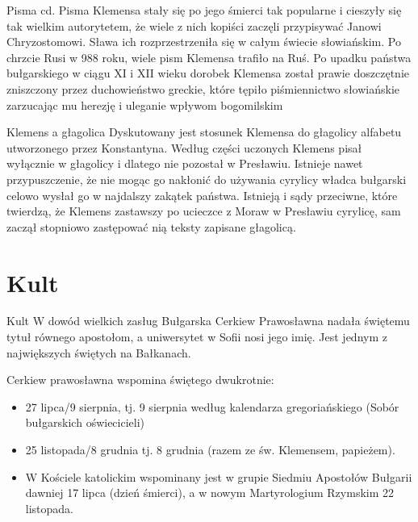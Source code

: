 \documentclass{beamer}
\begin{document}
\begin{frame}{Pisma cd.}
Pisma Klemensa stały się po jego śmierci tak popularne i cieszyły się tak wielkim autorytetem, że wiele z nich kopiści zaczęli przypisywać Janowi Chryzostomowi. Sława ich rozprzestrzeniła się w całym świecie słowiańskim. Po chrzcie Rusi w 988 roku, wiele pism Klemensa trafiło na Ruś. Po upadku państwa bułgarskiego w ciągu XI i XII wieku dorobek Klemensa został prawie doszczętnie zniszczony przez duchowieństwo greckie, które tępiło piśmiennictwo słowiańskie zarzucając mu herezję i uleganie wpływom bogomilskim
\end{frame}

\begin{frame}{Klemens a głagolica}
Dyskutowany jest stosunek Klemensa do głagolicy alfabetu utworzonego przez Konstantyna. Według części uczonych Klemens pisał wyłącznie w głagolicy i dlatego nie pozostał w Presławiu. Istnieje nawet przypuszczenie, że nie mogąc go nakłonić do używania cyrylicy władca bułgarski celowo wysłał go w najdalszy zakątek państwa. Istnieją i sądy przeciwne, które twierdzą, że Klemens zastawszy po ucieczce z Moraw w Presławiu cyrylicę, sam zaczął stopniowo zastępować nią teksty zapisane głagolicą.
\end{frame}

\section{Kult}
\begin{frame}{Kult}
W dowód wielkich zasług Bułgarska Cerkiew Prawosławna nadała świętemu tytuł równego apostołom, a uniwersytet w Sofii nosi jego imię. Jest jednym z największych świętych na Bałkanach.

Cerkiew prawosławna wspomina świętego dwukrotnie:
\begin{itemize}
\item<2-4> 27 lipca/9 sierpnia, tj. 9 sierpnia według kalendarza gregoriańskiego (Sobór bułgarskich oświecicieli)
\item<3-4> 25 listopada/8 grudnia tj. 8 grudnia (razem ze św. Klemensem, papieżem).
\item<4> W Kościele katolickim wspominany jest w grupie Siedmiu Apostołów Bułgarii dawniej 17 lipca (dzień śmierci), a w nowym Martyrologium Rzymskim 22 listopada.
\end{itemize}
\end{frame}
\end{document}

